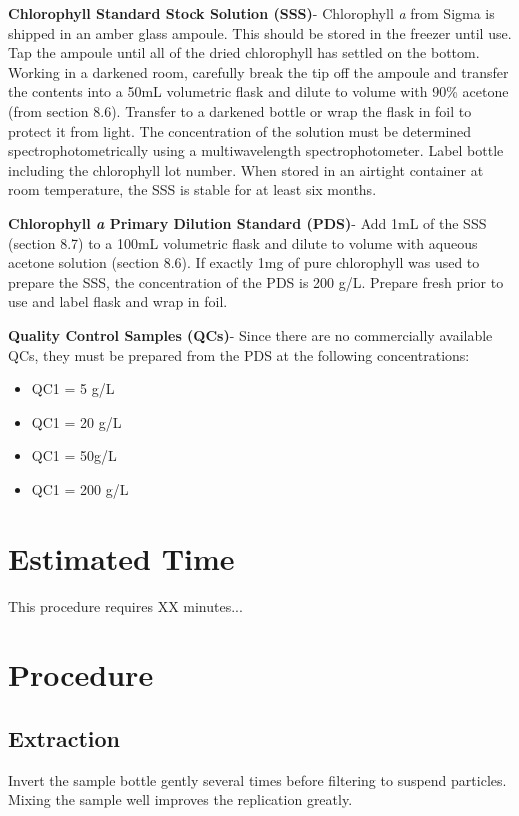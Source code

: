 \documentclass[12pt]{../SOP3_alpha}
\begin{document}
\NP \textbf{Chlorophyll Standard Stock Solution (SSS)}- Chlorophyll \textit{a} from Sigma is shipped in an amber glass ampoule. This should be stored in the freezer until use. Tap the ampoule until all of the dried chlorophyll has settled on the bottom. Working in a darkened room, carefully break the tip off the ampoule and transfer the contents into a 50mL volumetric flask and dilute to volume with 90\% acetone (from section 8.6). Transfer to a darkened bottle or wrap the flask in foil to protect it from light. The concentration of the solution must be determined spectrophotometrically using a multiwavelength spectrophotometer. Label bottle including the chlorophyll lot number. When stored in an airtight container at room temperature, the SSS is stable for at least six months.

\NP \textbf{Chlorophyll \textit{a} Primary Dilution Standard (PDS)}- Add 1mL of the SSS (section 8.7) to a 100mL volumetric flask and dilute to volume with aqueous acetone solution (section 8.6). If exactly 1mg of pure chlorophyll was used to prepare the SSS, the concentration of the PDS is 200 \micro g/L. Prepare fresh prior to use and label flask and wrap in foil.

\NP \textbf{Quality Control Samples (QCs)}- Since there are no commercially available QCs, they must be prepared from the PDS at the following concentrations:
\begin{itemize}
\item QC1 = 5 \micro g/L
\item QC1 = 20 \micro g/L
\item QC1 = 50\micro g/L
\item QC1 = 200 \micro g/L
\end{itemize}

\section{Estimated Time}

\NP This procedure requires XX minutes...

\section{Procedure} 


\subsection*{Extraction}
\NP Invert the sample bottle gently several times before filtering to suspend particles. Mixing the sample well improves the replication greatly.
\end{document}

